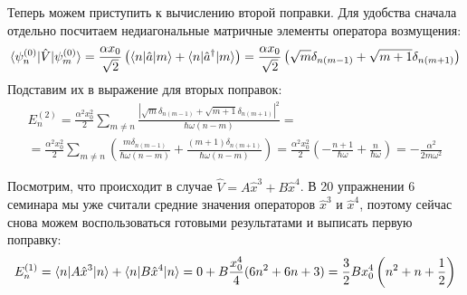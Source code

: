 Теперь можем приступить к вычислению второй поправки. Для удобства сначала
отдельно посчитаем недиагональные матричные элементы оператора возмущения:
\[
  \langle\psi_n^{(0)}\rvert\hat{V}\lvert\psi_m^{(0)}\rangle = \frac{\alpha x_0}{\sqrt{2}}\left(\langle n\rvert\hat{a}\lvert m\rangle+\langle n\rvert\hat{a}^{\dagger}\lvert m\rangle\right) = \frac{\alpha x_0}{\sqrt{2}}\left(\sqrt{m}\delta_{n(m-1)}+\sqrt{m+1}\delta_{n(m+1)}\right)
\]
Подставим их в выражение для вторых поправок:
\begin{multline*}
  E_n^{(2)} = \frac{\alpha^2 x_0^2}{2} \sum\limits_{m\neq n} \frac{\left|\sqrt{m} \delta_{n(m-1)} +\sqrt{m+1}\delta_{n(m+1)}\right|^2}{\hbar\omega(n-m)} =\\= \frac{\alpha^2 x_0^2}{2} \sum\limits_{m\neq n} \left(\frac{m\delta_{n(m-1)}}{\hbar\omega(n-m)}+\frac{(m+1)\delta_{n(m+1)}}{\hbar\omega(n-m)}\right) = \frac{\alpha^2 x_0^2}{2}\left(-\frac{n+1}{\hbar\omega}+\frac{n}{\hbar\omega}\right) = -\frac{\alpha^2}{2m\omega^2}
\end{multline*}

Посмотрим, что происходит в случае $\hat{V} = A\hat{x}^3+B\hat{x}^4$. В 20
упражнении 6 семинара мы уже считали средние значения операторов $\hat{x}^3$ и
$\hat{x}^4$, поэтому сейчас снова можем воспользоваться готовыми результатами и
выписать первую поправку:
\[
  E_n^{(1)} = \langle n\rvert A\hat{x}^3\lvert n\rangle + \langle n\rvert B\hat{x}^4\lvert n\rangle = 0 + B\frac{x_0^4}{4}(6n^2+6n+3) = \frac{3}{2}Bx_0^4\left(n^2+n+\frac{1}{2}\right)
\]


